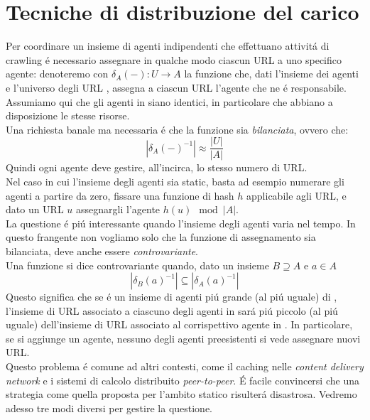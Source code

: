 \section{Tecniche di distribuzione del carico}
Per coordinare un insieme  di agenti indipendenti che effettuano attivitá di crawling é necessario assegnare in qualche modo ciascun URL a uno specifico agente: denoteremo con $\delta_A(-): U \rightarrow A$ la funzione che, dati l'insieme dei agenti  e l'universo degli URL , assegna a ciascun URL l'agente che ne é responsabile. Assumiamo qui che gli agenti in  siano identici, in particolare che abbiano a disposizione le stesse risorse.\\
Una richiesta banale ma necessaria é che la funzione sia \textit{bilanciata}, ovvero che:
\begin{equation*}
    |\delta_A(-)^{-1}| \approx \frac{|U|}{|A|}
\end{equation*}
Quindi ogni agente deve gestire, all'incirca, lo stesso numero di URL.\\
Nel caso in cui l'insieme degli agenti sia static, basta ad esempio numerare gli agenti a partire da zero, fissare una funzione di hash $h$ applicabile agli URL, e dato un URL $u$ assegnargli l'agente $h(u)\mod|A|$.\\
La questione é piú interessante quando l'insieme degli agenti varia nel tempo. In questo frangente non vogliamo solo che la funzione di assegnamento sia bilanciata, deve anche essere \textit{controvariante}.\\
Una funzione si dice controvariante quando, dato un insieme $B \supseteq A$ e $a \in A$
\begin{equation*}
    |\delta_B(a)^{-1}| \subseteq |\delta_A(a)^{-1}|
\end{equation*}
Questo significa che se  é un insieme di agenti piú grande (al piú uguale) di , l'insieme di URL associato a ciascuno degli agenti in  sará piú piccolo (al piú uguale) dell'insieme di URL associato al corrispettivo agente in . In particolare, se si aggiunge un agente, nessuno degli agenti preesistenti si vede assegnare nuovi URL.\\
Questo problema é comune ad altri contesti, come il caching nelle \textit{content delivery network} e i sistemi di calcolo distribuito \textit{peer-to-peer}. É facile convincersi che una strategia come quella proposta per l'ambito statico risulterá disastrosa. Vedremo adesso tre modi diversi per gestire la questione.
